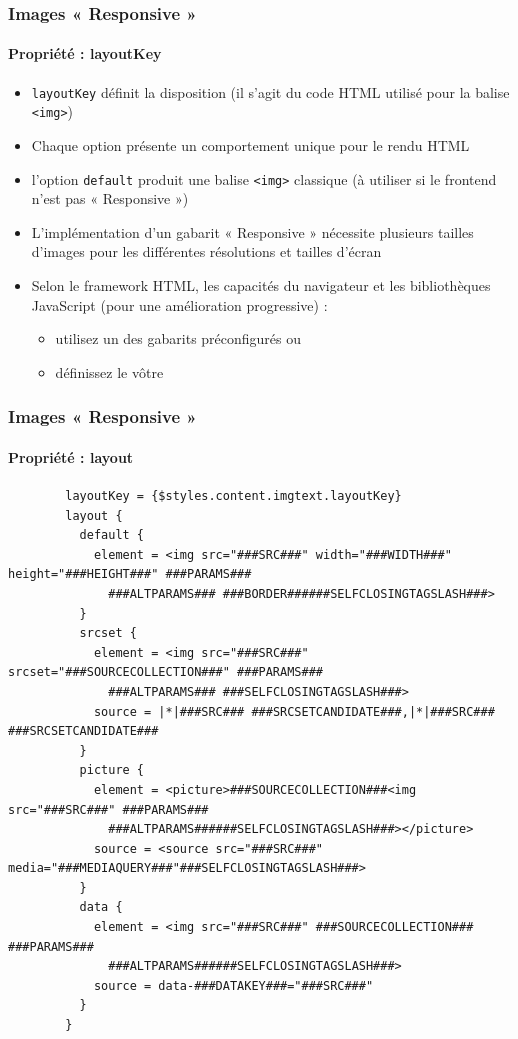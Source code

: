 \begin{frame}[fragile]
	\frametitle{Images « Responsive »}
	\framesubtitle{Propriété : layoutKey}

	\begin{itemize}
		\item \texttt{layoutKey} définit la disposition\newline
			(il s'agit du code HTML utilisé pour la balise \texttt{<img>})
		\item Chaque option présente un comportement unique pour le rendu HTML
		\item l'option \texttt{default} produit une balise \texttt{<img>} classique\newline
			(à utiliser si le frontend n'est pas « Responsive »)
		\item L'implémentation d'un gabarit « Responsive » nécessite plusieurs tailles d'images pour les différentes résolutions et tailles d'écran
		\item Selon le framework HTML, les capacités du navigateur et les bibliothèques JavaScript (pour une amélioration progressive) :

			\begin{itemize}
				\item utilisez un des gabarits préconfigurés ou
				\item définissez le vôtre
			\end{itemize}

	\end{itemize}

\end{frame}


\begin{frame}[fragile]
	\frametitle{Images « Responsive »}
	\framesubtitle{Propriété : layout}

	\lstset{
		basicstyle=\tiny\ttfamily
	}

	\begin{lstlisting}
		layoutKey = {$styles.content.imgtext.layoutKey}
		layout {
		  default {
		    element = <img src="###SRC###" width="###WIDTH###" height="###HEIGHT###" ###PARAMS###
		      ###ALTPARAMS### ###BORDER######SELFCLOSINGTAGSLASH###>
		  }
		  srcset {
		    element = <img src="###SRC###" srcset="###SOURCECOLLECTION###" ###PARAMS###
		      ###ALTPARAMS### ###SELFCLOSINGTAGSLASH###>
		    source = |*|###SRC### ###SRCSETCANDIDATE###,|*|###SRC### ###SRCSETCANDIDATE###
		  }
		  picture {
		    element = <picture>###SOURCECOLLECTION###<img src="###SRC###" ###PARAMS###
		      ###ALTPARAMS######SELFCLOSINGTAGSLASH###></picture>
		    source = <source src="###SRC###" media="###MEDIAQUERY###"###SELFCLOSINGTAGSLASH###>
		  }
		  data {
		    element = <img src="###SRC###" ###SOURCECOLLECTION### ###PARAMS###
		      ###ALTPARAMS######SELFCLOSINGTAGSLASH###>
		    source = data-###DATAKEY###="###SRC###"
		  }
		}
	\end{lstlisting}

\end{frame}

